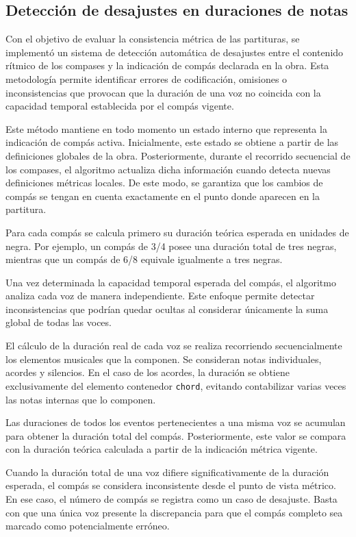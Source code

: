 \subsection{Detección de desajustes en duraciones de notas}
Con el objetivo de evaluar la consistencia métrica de las partituras, se implementó un sistema de detección automática de desajustes entre el contenido rítmico de los compases y la indicación de compás declarada en la obra. Esta metodología permite identificar errores de codificación, omisiones o inconsistencias que provocan que la duración de una voz no coincida con la capacidad temporal establecida por el compás vigente.

Este método mantiene en todo momento un estado interno que representa la indicación de compás activa. Inicialmente, este estado se obtiene a partir de las definiciones globales de la obra. Posteriormente, durante el recorrido secuencial de los compases, el algoritmo actualiza dicha información cuando detecta nuevas definiciones métricas locales. De este modo, se garantiza que los cambios de compás se tengan en cuenta exactamente en el punto donde aparecen en la partitura.

Para cada compás se calcula primero su duración teórica esperada en unidades de negra. Por ejemplo, un compás de 3/4 posee una duración total de tres negras, mientras que un compás de 6/8 equivale igualmente a tres negras.

Una vez determinada la capacidad temporal esperada del compás, el algoritmo analiza cada voz de manera independiente. Este enfoque permite detectar inconsistencias que podrían quedar ocultas al considerar únicamente la suma global de todas las voces.

El cálculo de la duración real de cada voz se realiza recorriendo secuencialmente los elementos musicales que la componen. Se consideran notas individuales, acordes y silencios. En el caso de los acordes, la duración se obtiene exclusivamente del elemento contenedor \verb|chord|, evitando contabilizar varias veces las notas internas que lo componen. 

Las duraciones de todos los eventos pertenecientes a una misma voz se acumulan para obtener la duración total del compás. Posteriormente, este valor se compara con la duración teórica calculada a partir de la indicación métrica vigente.

Cuando la duración total de una voz difiere significativamente de la duración esperada, el compás se considera inconsistente desde el punto de vista métrico. En ese caso, el número de compás se registra como un caso de desajuste. Basta con que una única voz presente la discrepancia para que el compás completo sea marcado como potencialmente erróneo.

